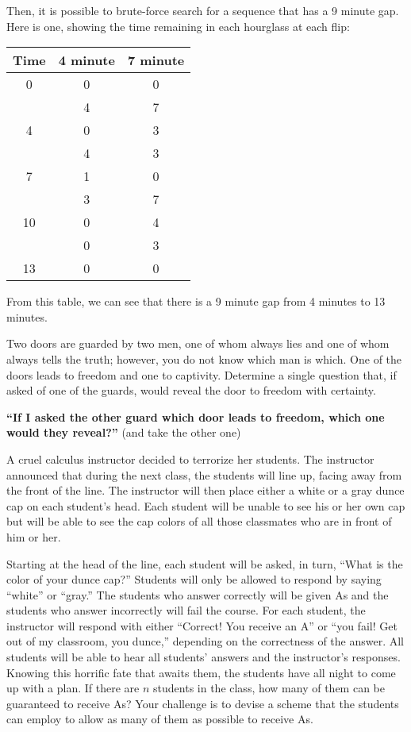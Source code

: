 \documentclass[answers]{exam}
\begin{document}
\begin{questions}
\begin{solution}
Then, it is possible to brute-force search for a sequence that has a 9 minute gap. Here is one, showing the time remaining in each hourglass at each flip:

\begin{center}
	\begin{tabular}{c | c | c}
		Time & 4 minute & 7 minute \\
		\hline
		0 & 0 & 0 \\
		  & 4 & 7 \\
		\hline
		4 & 0 & 3 \\
		  & 4 & 3 \\
		\hline
		7 & 1 & 0 \\
		  & 3 & 7 \\
		\hline
		10& 0 & 4 \\
		  & 0 & 3 \\
		\hline
		13& 0 & 0 \\
	\end{tabular}
\end{center}

From this table, we can see that there is a 9 minute gap from 4 minutes to 13 minutes.

\end{solution}

\question %
Two doors are guarded by two men, one of whom always lies and one of whom always tells the truth; however, you do not know which man is which. One of the doors leads to freedom and one to captivity. Determine a single question that, if asked of one of the guards, would reveal the door to freedom with certainty.

\begin{solution}
\textbf{``If I asked the other guard which door leads to freedom, which one would they reveal?''} (and take the other one)
\end{solution}

\question %
A cruel calculus instructor decided to terrorize her students. The instructor announced that during the next class, the students will line up, facing away from the front of the line. The instructor will then place either a white or a gray dunce cap on each student's head. Each student will be unable to see his or her own cap but will be able to see the cap colors of all those classmates who are in front of him or her.

Starting at the head of the line, each student will be asked, in turn, ``What is the color of your dunce cap?'' Students will only be allowed to respond by saying ``white'' or ``gray.'' The students who answer correctly will be given As and the students who answer incorrectly will fail the course. For each student, the instructor will respond with either ``Correct! You receive an A'' or ``you fail! Get out of my classroom, you dunce,'' depending on the correctness of the answer. All students will be able to hear all students' answers and the instructor's responses. Knowing this horrific fate that awaits them, the students have all night to come up with a plan. If there are $n$ students in the class, how many of them can be guaranteed to receive As? Your challenge is to devise a scheme that the students can employ to allow as many of them as possible to receive As.


\end{questions}
\end{document}
